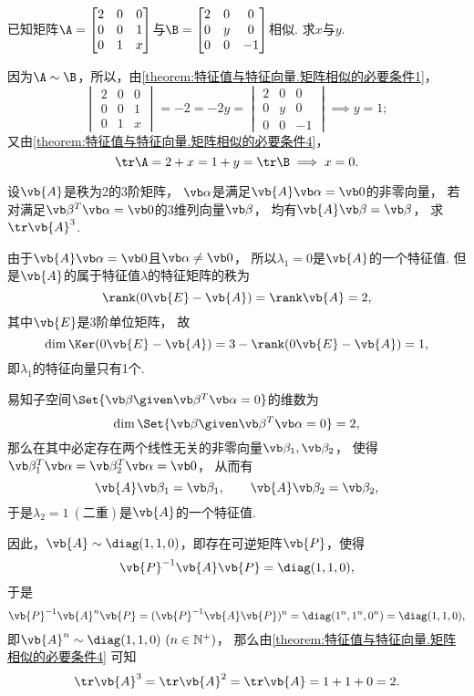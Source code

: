 \begin{example}
已知矩阵\(\A = \begin{bmatrix}
	2 & 0 & 0 \\
	0 & 0 & 1 \\
	0 & 1 & x
\end{bmatrix}\)与\(\B = \begin{bmatrix}
	2 & 0 & 0 \\
	0 & y & 0 \\
	0 & 0 & -1
\end{bmatrix}\)相似.
求\(x\)与\(y\).
\begin{solution}
因为\(\A\sim\B\)，所以，由\cref{theorem:特征值与特征向量.矩阵相似的必要条件1}，
\[
	\begin{vmatrix}
		2 & 0 & 0 \\
		0 & 0 & 1 \\
		0 & 1 & x
	\end{vmatrix}
	= -2 = -2y =
	\begin{vmatrix}
		2 & 0 & 0 \\
		0 & y & 0 \\
		0 & 0 & -1
	\end{vmatrix}
	\implies y = 1;
\]
又由\cref{theorem:特征值与特征向量.矩阵相似的必要条件4}，
\[
	\tr\A = 2+x
	= 1+y = \tr\B
	\implies
	x = 0.
\]
\end{solution}
\end{example}

\begin{example}
设\(\vb{A}\)是秩为2的3阶矩阵，
\(\vb\alpha\)是满足\(\vb{A} \vb\alpha = \vb0\)的非零向量，
若对满足\(\vb\beta^T \vb\alpha = \vb0\)的3维列向量\(\vb\beta\)，
均有\(\vb{A} \vb\beta = \vb\beta\)，
求\(\tr\vb{A}^3\).
\begin{solution}
由于\(\vb{A} \vb\alpha = \vb0\)且\(\vb\alpha \neq \vb0\)，
所以\(\lambda_1 = 0\)是\(\vb{A}\)的一个特征值.
但是\(\vb{A}\)的属于特征值\(\lambda\)的特征矩阵的秩为\[
	\rank(0\vb{E}-\vb{A})
	= \rank\vb{A}
	= 2,
\]
其中\(\vb{E}\)是3阶单位矩阵，
故\[
	\dim\Ker(0\vb{E}-\vb{A})
	= 3 - \rank(0\vb{E}-\vb{A})
	= 1,
\]
即\(\lambda_1\)的特征向量只有1个.

易知子空间\(\Set{\vb\beta \given \vb\beta^T \vb\alpha = 0}\)的维数为\[
	\dim\Set{\vb\beta \given \vb\beta^T \vb\alpha = 0} = 2,
\]
那么在其中必定存在两个线性无关的非零向量\(\vb\beta_1,\vb\beta_2\)，
使得\(\vb\beta_1^T \vb\alpha
= \vb\beta_2^T \vb\alpha
= \vb0\)，
从而有\[
	\vb{A}\vb\beta_1 = \vb\beta_1,
	\qquad
	\vb{A}\vb\beta_2 = \vb\beta_2,
\]
于是\(\lambda_2 = 1\ (\text{二重})\)是\(\vb{A}\)的一个特征值.

因此，\(\vb{A} \sim \diag(1,1,0)\)，即存在可逆矩阵\(\vb{P}\)，使得\[
	\vb{P}^{-1} \vb{A} \vb{P}
	= \diag(1,1,0),
\]
于是\[
	\vb{P}^{-1} \vb{A}^n \vb{P}
	= (\vb{P}^{-1} \vb{A} \vb{P})^n
	= \diag(1^n,1^n,0^n)
	= \diag(1,1,0),
\]
即\(\vb{A}^n \sim \diag(1,1,0)\ (n\in\mathbb{N}^+)\)，
那么由\cref{theorem:特征值与特征向量.矩阵相似的必要条件4}
可知\[
	\tr\vb{A}^3
	= \tr\vb{A}^2
	= \tr\vb{A}
	= 1+1+0
	= 2.
\]
\end{solution}
\end{example}

